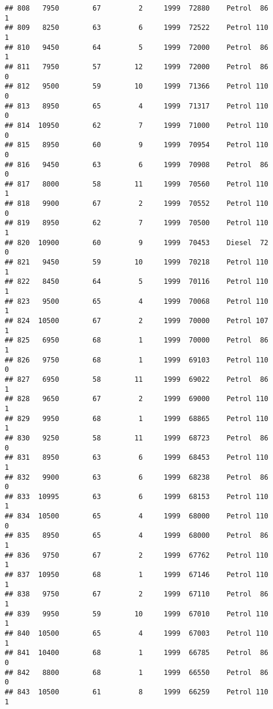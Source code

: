 \documentclass[]{article}
\begin{document}
\begin{verbatim}
## 808   7950        67         2     1999  72880    Petrol  86         1
## 809   8250        63         6     1999  72522    Petrol 110         1
## 810   9450        64         5     1999  72000    Petrol  86         1
## 811   7950        57        12     1999  72000    Petrol  86         0
## 812   9500        59        10     1999  71366    Petrol 110         0
## 813   8950        65         4     1999  71317    Petrol 110         0
## 814  10950        62         7     1999  71000    Petrol 110         0
## 815   8950        60         9     1999  70954    Petrol 110         0
## 816   9450        63         6     1999  70908    Petrol  86         0
## 817   8000        58        11     1999  70560    Petrol 110         1
## 818   9900        67         2     1999  70552    Petrol 110         0
## 819   8950        62         7     1999  70500    Petrol 110         1
## 820  10900        60         9     1999  70453    Diesel  72         0
## 821   9450        59        10     1999  70218    Petrol 110         1
## 822   8450        64         5     1999  70116    Petrol 110         1
## 823   9500        65         4     1999  70068    Petrol 110         1
## 824  10500        67         2     1999  70000    Petrol 107         1
## 825   6950        68         1     1999  70000    Petrol  86         1
## 826   9750        68         1     1999  69103    Petrol 110         0
## 827   6950        58        11     1999  69022    Petrol  86         1
## 828   9650        67         2     1999  69000    Petrol 110         1
## 829   9950        68         1     1999  68865    Petrol 110         1
## 830   9250        58        11     1999  68723    Petrol  86         0
## 831   8950        63         6     1999  68453    Petrol 110         1
## 832   9900        63         6     1999  68238    Petrol  86         0
## 833  10995        63         6     1999  68153    Petrol 110         1
## 834  10500        65         4     1999  68000    Petrol 110         0
## 835   8950        65         4     1999  68000    Petrol  86         1
## 836   9750        67         2     1999  67762    Petrol 110         1
## 837  10950        68         1     1999  67146    Petrol 110         1
## 838   9750        67         2     1999  67110    Petrol  86         1
## 839   9950        59        10     1999  67010    Petrol 110         1
## 840  10500        65         4     1999  67003    Petrol 110         1
## 841  10400        68         1     1999  66785    Petrol  86         0
## 842   8800        68         1     1999  66550    Petrol  86         0
## 843  10500        61         8     1999  66259    Petrol 110         1

\end{verbatim}
\end{document}
